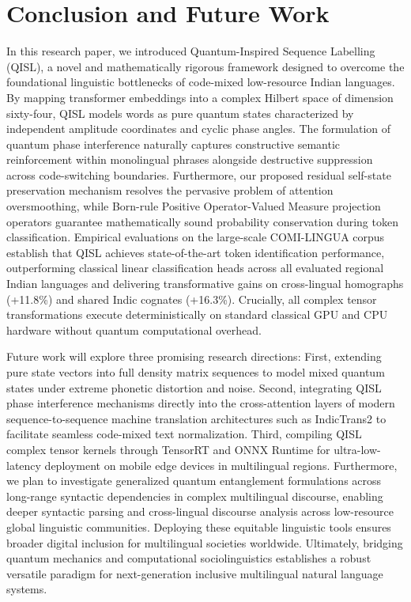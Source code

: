 \documentclass[10pt,twocolumn,letterpaper]{article}
\theoremstyle{definition}
\begin{document}
\section{Conclusion and Future Work}
In this research paper, we introduced Quantum-Inspired Sequence Labelling (QISL), a novel and mathematically rigorous framework designed to overcome the foundational linguistic bottlenecks of code-mixed low-resource Indian languages. By mapping transformer embeddings into a complex Hilbert space of dimension sixty-four, QISL models words as pure quantum states characterized by independent amplitude coordinates and cyclic phase angles. The formulation of quantum phase interference naturally captures constructive semantic reinforcement within monolingual phrases alongside destructive suppression across code-switching boundaries. Furthermore, our proposed residual self-state preservation mechanism resolves the pervasive problem of attention oversmoothing, while Born-rule Positive Operator-Valued Measure projection operators guarantee mathematically sound probability conservation during token classification. Empirical evaluations on the large-scale COMI-LINGUA corpus establish that QISL achieves state-of-the-art token identification performance, outperforming classical linear classification heads across all evaluated regional Indian languages and delivering transformative gains on cross-lingual homographs (+11.8\%) and shared Indic cognates (+16.3\%). Crucially, all complex tensor transformations execute deterministically on standard classical GPU and CPU hardware without quantum computational overhead.

Future work will explore three promising research directions: First, extending pure state vectors into full density matrix sequences to model mixed quantum states under extreme phonetic distortion and noise. Second, integrating QISL phase interference mechanisms directly into the cross-attention layers of modern sequence-to-sequence machine translation architectures such as IndicTrans2 to facilitate seamless code-mixed text normalization. Third, compiling QISL complex tensor kernels through TensorRT and ONNX Runtime for ultra-low-latency deployment on mobile edge devices in multilingual regions. Furthermore, we plan to investigate generalized quantum entanglement formulations across long-range syntactic dependencies in complex multilingual discourse, enabling deeper syntactic parsing and cross-lingual discourse analysis across low-resource global linguistic communities. Deploying these equitable linguistic tools ensures broader digital inclusion for multilingual societies worldwide. Ultimately, bridging quantum mechanics and computational sociolinguistics establishes a robust versatile paradigm for next-generation inclusive multilingual natural language systems.
\end{document}
